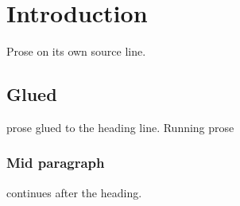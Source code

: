 \section{Introduction}
Prose on its own source line.
\subsection{Glued} prose glued to the heading line.
Running prose \subsubsection{Mid paragraph} continues after the heading.
